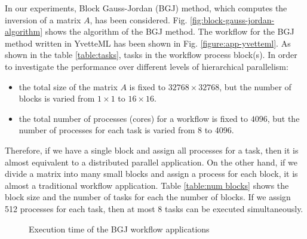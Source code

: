 \documentclass[graybox]{svmult}
\begin{document}
In our experiments, Block Gauss-Jordan (BGJ) method, which computes the inversion of a matrix $A$, has been considered. 
Fig. \ref{fig:block-gauss-jordan-algorithm} shows the algorithm of the BGJ method. The workflow for the BGJ method written in YvetteML has been shown in Fig. \ref{figure:app-yvetteml}.
As shown in the table \ref{table:tasks}, 
tasks in the workflow process block(s). 
In order to investigate the performance over different levels of hierarchical parallelism:
\begin{itemize}
 \item the total size of the matrix $A$ is fixed to $32768\times 32768$, but the number of blocks is varied from $1\times1$ to $16 \times 16$. 
 \item the total number of processes (cores) for a workflow is fixed to $4096$, but the number of processes for each task is varied from 8 to 4096. 
\end{itemize}
Therefore, if we have a single block and assign all processes for a task, then it is almost equivalent to a distributed parallel application. 
On the other hand, if we divide a matrix into many small blocks and assign a process for each block, it is almost a traditional workflow application. 
Table \ref{table:num blocks} shows the block size and the number of tasks for each the number of blocks.
If we assign 512 processes for each task, then at most 8 tasks can be executed simultaneously. 


\begin{figure}[t]
 \begin{center}
 \end{center}
 \caption{Execution time of the BGJ workflow applications}
\label{fig:result-bgj}
\end{figure}
\end{document}
